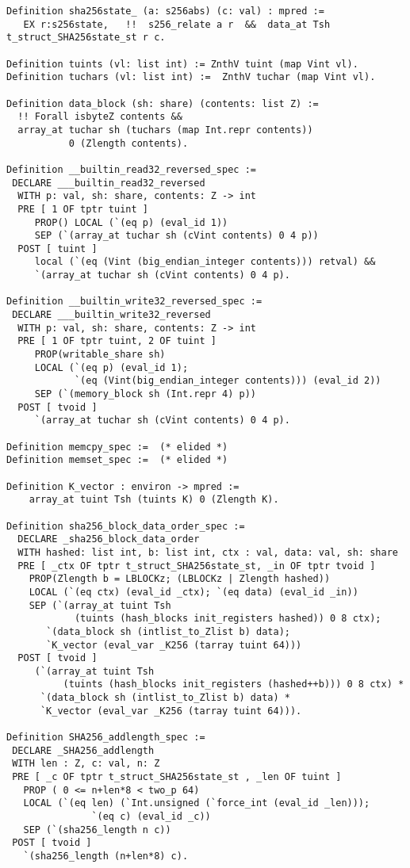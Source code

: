 \documentclass[prodmode,acmtoplas]{acmsmall}
\begin{document}
\begin{lstlisting}
Definition sha256state_ (a: s256abs) (c: val) : mpred :=
   EX r:s256state,   !!  s256_relate a r  &&  data_at Tsh t_struct_SHA256state_st r c.

Definition tuints (vl: list int) := ZnthV tuint (map Vint vl).
Definition tuchars (vl: list int) :=  ZnthV tuchar (map Vint vl).

Definition data_block (sh: share) (contents: list Z) :=
  !! Forall isbyteZ contents &&
  array_at tuchar sh (tuchars (map Int.repr contents))
           0 (Zlength contents).

Definition __builtin_read32_reversed_spec :=
 DECLARE ___builtin_read32_reversed
  WITH p: val, sh: share, contents: Z -> int
  PRE [ 1 OF tptr tuint ] 
     PROP() LOCAL (`(eq p) (eval_id 1))
     SEP (`(array_at tuchar sh (cVint contents) 0 4 p))
  POST [ tuint ] 
     local (`(eq (Vint (big_endian_integer contents))) retval) &&
     `(array_at tuchar sh (cVint contents) 0 4 p).

Definition __builtin_write32_reversed_spec :=
 DECLARE ___builtin_write32_reversed
  WITH p: val, sh: share, contents: Z -> int
  PRE [ 1 OF tptr tuint, 2 OF tuint ] 
     PROP(writable_share sh)
     LOCAL (`(eq p) (eval_id 1);
            `(eq (Vint(big_endian_integer contents))) (eval_id 2))
     SEP (`(memory_block sh (Int.repr 4) p))
  POST [ tvoid ] 
     `(array_at tuchar sh (cVint contents) 0 4 p).

Definition memcpy_spec :=  (* elided *)
Definition memset_spec :=  (* elided *)

Definition K_vector : environ -> mpred :=
    array_at tuint Tsh (tuints K) 0 (Zlength K).

Definition sha256_block_data_order_spec :=
  DECLARE _sha256_block_data_order
  WITH hashed: list int, b: list int, ctx : val, data: val, sh: share
  PRE [ _ctx OF tptr t_struct_SHA256state_st, _in OF tptr tvoid ]
    PROP(Zlength b = LBLOCKz; (LBLOCKz | Zlength hashed)) 
    LOCAL (`(eq ctx) (eval_id _ctx); `(eq data) (eval_id _in))
    SEP (`(array_at tuint Tsh  
            (tuints (hash_blocks init_registers hashed)) 0 8 ctx);
       `(data_block sh (intlist_to_Zlist b) data);
       `K_vector (eval_var _K256 (tarray tuint 64)))
  POST [ tvoid ]
     (`(array_at tuint Tsh  
          (tuints (hash_blocks init_registers (hashed++b))) 0 8 ctx) *
      `(data_block sh (intlist_to_Zlist b) data) *
      `K_vector (eval_var _K256 (tarray tuint 64))).
 
Definition SHA256_addlength_spec :=
 DECLARE _SHA256_addlength
 WITH len : Z, c: val, n: Z
 PRE [ _c OF tptr t_struct_SHA256state_st , _len OF tuint ]
   PROP ( 0 <= n+len*8 < two_p 64) 
   LOCAL (`(eq len) (`Int.unsigned (`force_int (eval_id _len))); 
               `(eq c) (eval_id _c))
   SEP (`(sha256_length n c))
 POST [ tvoid ]
   `(sha256_length (n+len*8) c).


\end{lstlisting}
\end{document}
